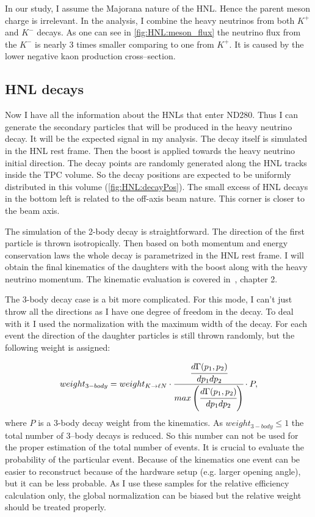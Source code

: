 \documentclass[../main.tex]{subfiles}
\begin{document}
In our study, I assume the Majorana nature of the HNL. Hence the parent meson charge is irrelevant. In the analysis, I combine the heavy neutrinos from both $K^+$ and $K^-$ decays. As one can see in \autoref{fig:HNL:meson_flux} the neutrino flux from the $K^-$ is nearly 3 times smaller comparing to one from $K^+$. It is caused by the lower negative kaon production cross--section.

\subsection{HNL decays}
Now I have all the information about the HNLs that enter ND280. Thus I can generate the secondary particles that will be produced in the heavy neutrino decay. It will be the expected signal in my analysis. The decay itself is simulated in the HNL rest frame. Then the boost is applied towards the heavy neutrino initial direction. The decay points are randomly generated along the  HNL tracks inside the TPC volume. So the decay positions are expected to be uniformly distributed in this volume (\autoref{fig:HNL:decayPos}). The small excess of HNL decays in the bottom left is related to the off-axis beam nature. This corner is closer to the beam axis.

The simulation of the 2-body decay is straightforward. The direction of the first particle is thrown isotropically. Then based on both momentum and energy conservation laws the whole decay is parametrized in the HNL rest frame. I will obtain the final kinematics of the daughters with the boost along with the heavy neutrino momentum. The kinematic evaluation is covered in~\cite{Landau2013}, chapter 2.

The 3-body decay case is a bit more complicated. For this mode, I can't just throw all the directions as I have one degree of freedom in the decay. To deal with it I used the normalization with the maximum width of the decay. For each event the direction of the daughter particles is still thrown randomly, but the following weight is assigned:

\begin{equation}
    weight_{3-body}=weight_{K\rightarrow \ell N}\cdot\cfrac{\cfrac{d\Gamma(p_1,p_2)}{dp_1dp_2}}{max\left(\cfrac{d\Gamma(p_1,p_2)}{dp_1dp_2}\right)}\cdot P,
\end{equation}
where $P$ is a 3-body decay weight from the kinematics. As $weight_{3-body} \le 1$ the total number of 3--body decays is reduced. So this number can not be used for the proper estimation of the total number of events. It is crucial to evaluate the probability of the particular event. Because of the kinematics one event can be easier to reconstruct because of the hardware setup (e.g. larger opening angle), but it can be less probable. As I use these samples for the relative efficiency calculation only, the global normalization can be biased but the relative weight should be treated properly.
\end{document}
